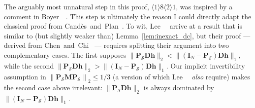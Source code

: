\begin{remark}
    The arguably most unnatural step in this proof, $\langle 1 \rangle 8 \langle 2 \rangle 1$, was inspired by a comment in Boyer~\etal~\cite[Appendix A]{boyer2019}. This step is ultimately the reason I could directly adapt the classical proof from Cand\`es~and~Plan~\cite{candes2011b}. To wit, Lee~\etal~\cite[Lemma 21]{lee2018} arrive at a result that is similar to (but slightly weaker than) Lemma~\ref{lem:inexact_dc}, but their proof --- derived from Chen~and~Chi~\cite{chen2014} --- requires splitting their argument into two complementary cases. The first supposes $\|\mathbf{P}_\mathcal{S} \mathbf{D h}\|_2 < \|(\mathbf{I}_N - \mathbf{P}_\mathcal{S}) \mathbf{D h}\|_1$, while the second $\|\mathbf{P}_\mathcal{S} \mathbf{D h}\|_2 > \|(\mathbf{I}_N - \mathbf{P}_\mathcal{S}) \mathbf{D h}\|_1$. Our implicit invertibility assumption in $\left \| \mathbf{P_\mathcal{S} M P_\mathcal{S}} \right \|_{2} \leq 1 / 3$ (a version of which Lee~\etal~\cite{lee2018} \emph{also} require) makes the second case above irrelevant: $\|\mathbf{P}_\mathcal{S} \mathbf{D h}\|_2$ is always dominated by $\|(\mathbf{I}_N - \mathbf{P}_\mathcal{S}) \mathbf{D h}\|_1$.
\end{remark}